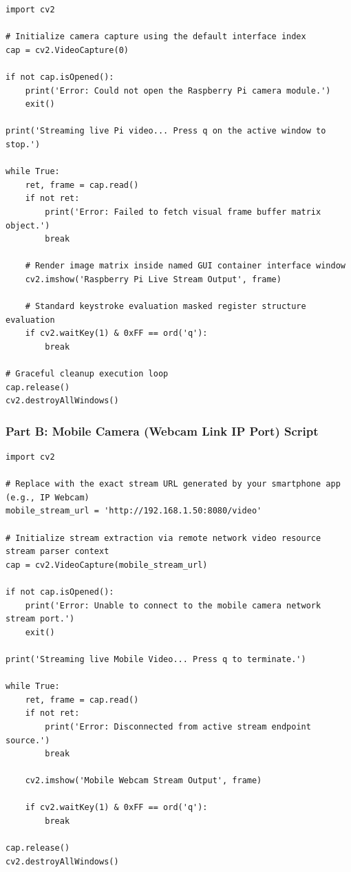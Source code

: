 \documentclass[12pt,a4paper]{article}
\begin{document}
\begin{codeblock}
\begin{lstlisting}[style=pythonstyle]
import cv2

# Initialize camera capture using the default interface index
cap = cv2.VideoCapture(0)

if not cap.isOpened():
    print('Error: Could not open the Raspberry Pi camera module.')
    exit()

print('Streaming live Pi video... Press q on the active window to stop.')

while True:
    ret, frame = cap.read()
    if not ret:
        print('Error: Failed to fetch visual frame buffer matrix object.')
        break

    # Render image matrix inside named GUI container interface window
    cv2.imshow('Raspberry Pi Live Stream Output', frame)

    # Standard keystroke evaluation masked register structure evaluation
    if cv2.waitKey(1) & 0xFF == ord('q'):
        break

# Graceful cleanup execution loop
cap.release()
cv2.destroyAllWindows()
\end{lstlisting}
\end{codeblock}

\vspace{0.6cm}

\subsubsection*{Part B: Mobile Camera (Webcam Link IP Port) Script}

\begin{codeblock}
\begin{lstlisting}[style=pythonstyle]
import cv2

# Replace with the exact stream URL generated by your smartphone app (e.g., IP Webcam)
mobile_stream_url = 'http://192.168.1.50:8080/video'

# Initialize stream extraction via remote network video resource stream parser context
cap = cv2.VideoCapture(mobile_stream_url)

if not cap.isOpened():
    print('Error: Unable to connect to the mobile camera network stream port.')
    exit()

print('Streaming live Mobile Video... Press q to terminate.')

while True:
    ret, frame = cap.read()
    if not ret:
        print('Error: Disconnected from active stream endpoint source.')
        break

    cv2.imshow('Mobile Webcam Stream Output', frame)

    if cv2.waitKey(1) & 0xFF == ord('q'):
        break

cap.release()
cv2.destroyAllWindows()
\end{lstlisting}
\end{codeblock}
\end{document}
